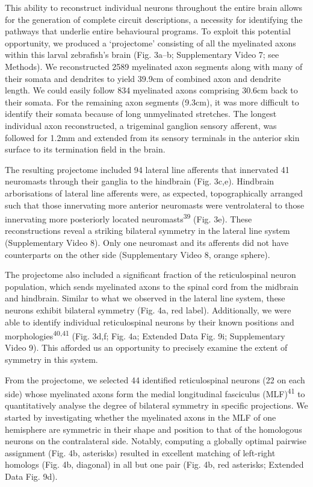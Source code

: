 \documentclass{article}
\begin{document}
This ability to reconstruct individual neurons throughout the entire brain allows for the generation of complete circuit descriptions, a necessity for identifying the pathways that underlie entire behavioural programs. To exploit this potential opportunity, we produced a ‘projectome’ consisting of all the myelinated axons within this larval zebrafish’s brain (Fig. 3a–b; Supplementary Video 7; see Methods). We reconstructed 2589 myelinated axon segments along
with many of their somata and dendrites to yield 39.9cm of combined axon and dendrite length. We could easily follow 834 myelinated axons comprising 30.6cm back to their somata. For the remaining axon segments (9.3cm), it was more difficult to identify their somata because of long unmyelinated stretches. The longest individual axon reconstructed, a trigeminal ganglion sensory afferent, was followed for 1.2mm and extended from its sensory terminals in the anterior skin surface to its termination field in the brain.

The resulting projectome included 94 lateral line afferents that innervated 41 neuromasts through their ganglia to the hindbrain (Fig. 3c,e). Hindbrain arborisations of lateral line afferents were, as expected, topographically arranged such that those innervating more anterior neuromasts were ventrolateral to those innervating more posteriorly located neuromasts\textsuperscript{39} (Fig. 3e). These reconstructions reveal a striking bilateral symmetry in the lateral line system (Supplementary Video 8). Only one neuromast and its afferents did not have counterparts on the other side (Supplementary Video 8, orange sphere).

The projectome also included a significant fraction of the reticulospinal neuron population, which sends myelinated axons to the spinal cord from the midbrain and hindbrain. Similar to what we observed in the lateral line system, these neurons exhibit bilateral symmetry (Fig. 4a, red label). Additionally, we were able to identify individual reticulospinal neurons by their known positions and morphologies\textsuperscript{40,41} (Fig. 3d,f; Fig. 4a; Extended Data Fig. 9i; Supplementary Video 9). This afforded us an opportunity to precisely examine the extent of symmetry in this system.

From the projectome, we selected 44 identified reticulospinal neurons (22 on each side) whose myelinated axons form the medial longitudinal fasciculus (MLF)\textsuperscript{41} to quantitatively analyse the degree of bilateral symmetry in specific projections. We started by investigating whether the myelinated axons in the MLF of one hemisphere are symmetric in their shape and position to that of the homologous neurons on the contralateral side. Notably, computing a globally optimal pairwise assignment (Fig. 4b, asterisks) resulted in excellent matching of left-right homologs (Fig. 4b, diagonal) in all but one pair (Fig. 4b, red asterisks; Extended Data Fig. 9d).
\end{document}
